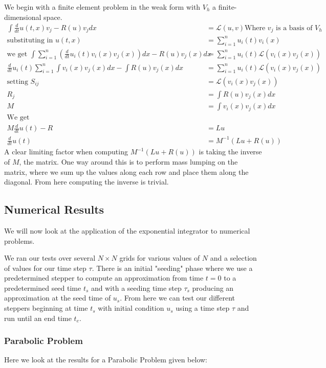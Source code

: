 \documentclass{article}
\begin{document}
We begin with a finite element problem in the weak form with $V_h$ a finite-dimensional space.
\begin{align*}
\int \frac d{dt}u(t,x) v_j - R(u) v_j dx &= \mathcal{L}(u,v)\text{Where $v_j$ is a basis of $V_h$}\\
\text{substituting in } u(t,x) &= \sum_{i=1}^n u_i(t)v_i(x)\\
\text{we get } \int\sum_{i=1}^n(\frac d{dt}u_i(t)v_i(x)v_j(x))dx - R(u)v_j(x)dx &= \sum_{i=1}^n u_i(t)\mathcal{L}(v_i(x)v_j(x))\\
\frac d{dt}u_i(t)\sum_{i=1}^n\int v_i(x)v_j(x)dx - \int R(u)v_j(x)dx &= \sum_{i=1}^n u_i(t)\mathcal{L}(v_i(x)v_j(x))\\
\text{setting } S_{ij} &= \mathcal{L}(v_i(x)v_j(x))\\
R_j &= \int R(u)v_j(x)dx\\
M &= \int v_i(x)v_j(x)dx\\
\text{We get}\\
M\frac d{dt}u(t) - R &= Lu\\
\frac d{dt}u(t) &= M^{-1}(Lu + R(u))
\end{align*}
A clear limiting factor when computing $M^{-1}(Lu + R(u))$ is taking the inverse of $M$, the matrix.
One way around this is to perform mass lumping on the matrix, where we sum up the values along each row and place them along the diagonal.
From here computing the inverse is trivial.

\subsection{Numerical Results}
We will now look at the application of the exponential integrator to numerical problems.

We ran our tests over several $N\times N$ grids for various values of $N$ and a selection of values for our time step $\tau$.
There is an initial "seeding" phase where we use a predetermined stepper to compute an approximation from time $t=0$ to a predetermined seed time $t_s$ and with a seeding time step $\tau_s$ producing an approximation at the seed time of $u_s$.
From here we can test our different steppers beginning at time $t_s$ with initial condition $u_s$ using a time step $\tau$ and run until an end time $t_e$.

\subsubsection{Parabolic Problem}
Here we look at the results for a Parabolic Problem given below:
\end{document}
